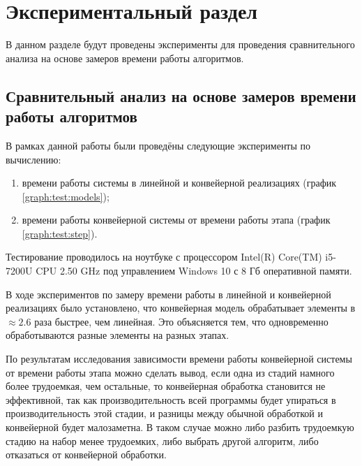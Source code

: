 \chapter{Экспериментальный раздел}
\label{cha:research}
    В данном разделе будут проведены эксперименты для проведения 
    сравнительного анализа на основе замеров времени работы алгоритмов.

    \section{Сравнительный анализ на основе замеров времени работы алгоритмов}
        В рамках данной работы были проведёны следующие эксперименты по вычислению: 
        \begin{enumerate}
            \item времени работы системы в линейной и конвейерной реализациях (график \ref{graph:test:models});
            \item времени работы конвейерной системы от времени работы этапа (график \ref{graph:test:step}).
        \end{enumerate}

        Тестирование проводилось на ноутбуке с процессором
        Intel(R) Core(TM) i5-7200U CPU 2.50 GHz \cite{processor-i5-7200u}
        под управлением Windows 10 с 8 Гб оперативной памяти.

        В ходе экспериментов по замеру времени работы в линейной и конвейерной реализациях было установлено,
        что конвейерная модель обрабатывает элементы в $ \approx 2.6 $ раза
        быстрее, чем линейная. Это объясняется тем,
        что одновременно обработываются разные элементы на разных этапах.
        
        По результатам исследования зависимости времени работы конвейерной системы от времени работы этапа  
        можно сделать вывод, если одна из стадий намного более трудоемкая, чем остальные,
        то конвейерная обработка становится не эффективной,
        так как производительность всей программы будет упираться в производительность этой стадии,
        и разницы между обычной обработкой и конвейерной будет малозаметна.
        В таком случае можно либо разбить трудоемкую стадию на набор менее трудоемких,
        либо выбрать другой алгоритм, либо отказаться от конвейерной обработки.


